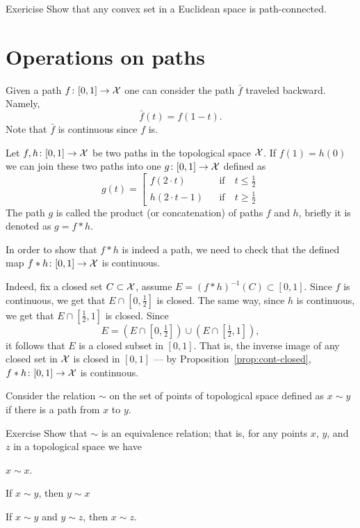 \begin{thm}{Exericise}
Show that any convex set in a Euclidean space is path-connected. 
\end{thm}

\section{Operations on paths}\label{sec:Operations on paths}

Given a path $f\colon[0,1]\to \mathcal{X}$ one can consider the path $\bar f$ traveled backward.
Namely, 
\[\bar f(t)=f(1-t).\]
Note that $\bar f$ is continuous since $f$ is.

Let $f,h\colon[0,1]\to \mathcal{X}$ be two paths in the topological space $\mathcal{X}$.
If $f(1)=h(0)$ we can join these two paths into one $g\colon[0,1]\to \mathcal{X}$ defined as 
\[g(t)=
\left[
\begin{aligned}
f(2\cdot t)&&\text{if}&\ t\le \tfrac12
\\
h(2\cdot t-1)&&\text{if}&\ t\ge \tfrac12
\end{aligned}
\right.
\]
The path $g$ is called the product (or concatenation) of paths $f$ and $h$, briefly it is denoted as $g=f * h$.

In order to show that $f * h$ is indeed a path, we need to check that the defined map $f * h\colon[0,1]\to \mathcal{X}$ is continuous.

Indeed, fix a closed set $C\subset \mathcal{X}$,
assume $E=(f * h)^{-1}(C)\subset [0,1]$.
Since $f$ is continuous, we get that $E\cap [0,\tfrac12]$ is closed.
The same way, since $h$ is continuous, we get that $E\cap [\tfrac12,1]$ is closed.
Since 
\[E=(E\cap [0,\tfrac12])\cup (E\cap [\tfrac12,1]),\] 
it follows that $E$ is a closed subset in $[0,1]$.
That is, the inverse image of any closed set in $\mathcal{X}$ is closed in $[0,1]$ --- by Proposition~\ref{prop:cont-closed}, $f * h\colon[0,1]\to \mathcal{X}$ is continuous.


Consider the relation $\sim$ on the set of points of topological space defined as $x\sim y$ if there is a path from $x$ to $y$.

\begin{thm}{Exercise}
Show that $\sim$ is an equivalence relation;
that is, for any points $x$, $y$, and $z$ in a topological space we have

\begin{subthm}{}
$x\sim x$.
\end{subthm}

\begin{subthm}{}
If $x\sim y$, then $y\sim x$
\end{subthm}

\begin{subthm}{}
If $x\sim y$ and $y\sim z$, then $x\sim z$.
\end{subthm}

\end{thm}

